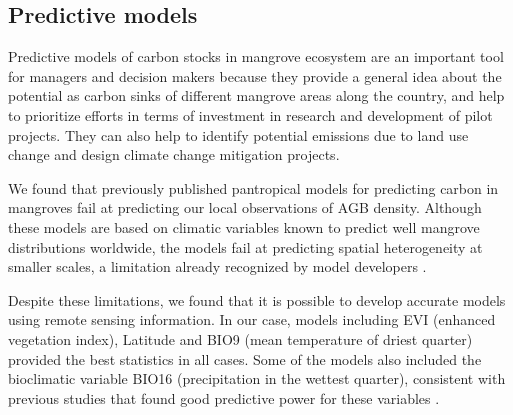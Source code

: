 \documentclass[review, authoryear]{elsarticle}   	%
\begin{document}
\subsection{Predictive models}
Predictive models of carbon stocks in mangrove ecosystem are an important tool for managers and decision makers because they provide a general idea about the potential as carbon sinks of different mangrove areas along the country, and help to prioritize efforts in terms of investment in research and development of pilot projects. They can also help to identify potential emissions due to land use change and design climate change mitigation projects. 

We found that previously published pantropical models for predicting carbon in mangroves fail at predicting our local observations of AGB density. Although these models are based on climatic variables known to predict well mangrove distributions worldwide, the models fail at predicting spatial heterogeneity at smaller scales, a limitation already recognized by model developers  \citep{CONL:CONL12060}.


Despite these limitations, we found that it is possible to develop accurate models using remote sensing information. In our case, models including EVI (enhanced vegetation index), Latitude and BIO9 (mean temperature of driest quarter) provided the best statistics in all cases. Some of the models also included the bioclimatic variable BIO16 (precipitation in the wettest quarter), consistent with previous studies that found good predictive power for these variables \citep{CONL:CONL12060, Herz1999, Anaya2009}.

\end{document}
